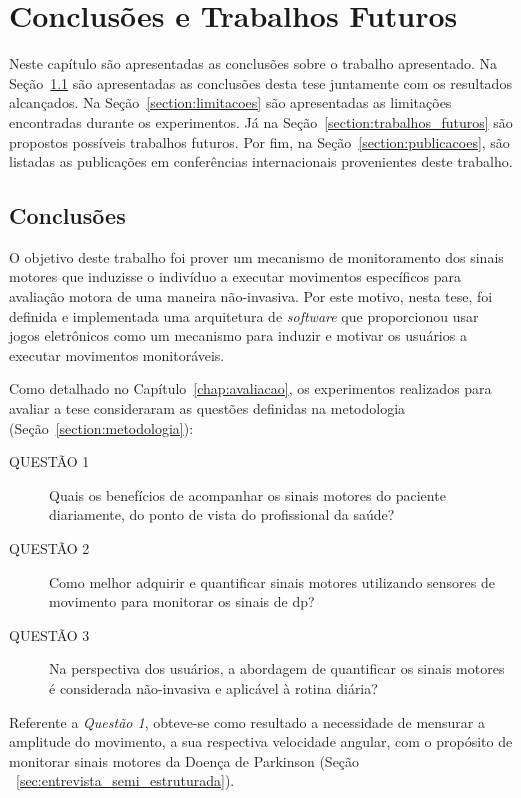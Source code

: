 \chapter{Conclusões e Trabalhos Futuros}\label{chapter:conclusoes_futuros}
Neste capítulo são apresentadas as conclusões sobre o trabalho apresentado. Na Seção~\ref{section:conclusoes} são apresentadas as conclusões desta tese juntamente com os resultados alcançados. Na Seção~\ref{section:limitacoes} são apresentadas as limitações encontradas durante os experimentos. Já na Seção~\ref{section:trabalhos_futuros} são propostos possíveis trabalhos futuros. Por fim, na Seção~\ref{section:publicacoes}, são listadas as publicações em conferências internacionais provenientes deste trabalho.




\section{Conclusões}\label{section:conclusoes}
O objetivo deste trabalho foi prover um mecanismo de monitoramento dos sinais motores que induzisse o indivíduo a executar movimentos específicos para avaliação motora de uma maneira não-invasiva. Por este motivo, nesta tese, foi definida e implementada uma arquitetura de \textit{software} que proporcionou usar jogos eletrônicos como um mecanismo para induzir e motivar os usuários a executar movimentos monitoráveis.

Como detalhado no Capítulo~\ref{chap:avaliacao}, os experimentos realizados para avaliar a tese consideraram as questões definidas na metodologia (Seção~\ref{section:metodologia}):
	\begin{description}
	\item[QUESTÃO 1] Quais os benefícios de acompanhar os sinais motores do paciente diariamente, do ponto de vista do profissional da saúde?
	\item[QUESTÃO 2] Como melhor adquirir e quantificar sinais motores utilizando sensores de movimento para monitorar os sinais de \ac{dp}?
	\item[QUESTÃO 3] Na perspectiva dos usuários, a abordagem de quantificar os sinais motores é considerada não-invasiva e aplicável à rotina diária?
	\end{description}



Referente a \textit{Questão 1}, obteve-se como resultado a necessidade de mensurar a amplitude do movimento, a sua respectiva velocidade angular, com o propósito de monitorar sinais motores da Doença de Parkinson (Seção ~\ref{sec:entrevista_semi_estruturada}).

